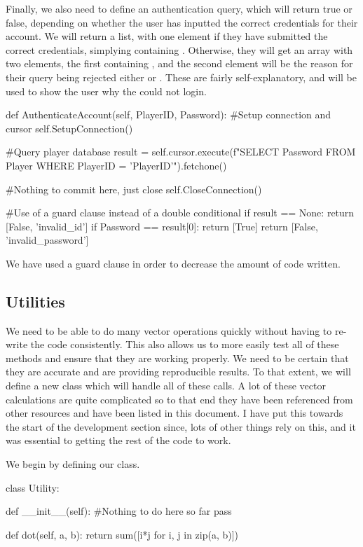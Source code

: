 Finally, we also need to define an authentication query, which will return true or false, depending on whether the user has inputted the correct credentials for their account. We will return a list, with one element if they have submitted the correct credentials, simplying containing \m{[True]}. Otherwise, they will get an array with two elements, the first containing , and the second element will be the reason for their query being rejected either  or . These are fairly self-explanatory, and will be used to show the user why the could not login.
\vs
\begin{mpy}
    def AuthenticateAccount(self, PlayerID, Password):
        #Setup connection and cursor
        self.SetupConnection()

        #Query player database
        result = self.cursor.execute(f"SELECT Password FROM Player WHERE PlayerID = '{PlayerID}'").fetchone()

        #Nothing to commit here, just close
        self.CloseConnection()

        #Use of a guard clause instead of a double conditional
        if result == None:
            return [False, 'invalid_id']
        if Password == result[0]:
            return [True]
        return [False, 'invalid_password']
\end{mpy}
\vs
We have used a guard clause in order to decrease the amount of code written.

\subsection{Utilities}

We need to be able to do many vector operations quickly without having to re-write the code consistently. This also allows us to more easily test all of these methods and ensure that they are working properly. We need to be certain that they are accurate and are providing reproducible results. To that extent, we will define a new class  which will handle all of these calls. A lot of these vector calculations are quite complicated so to that end they have been referenced from other resources and have been listed in this document. I have put this towards the start of the development section since, lots of other things rely on this, and it was essential to getting the rest of the code to work.

\vs
We begin by defining our class.
\begin{mpy}
class Utility:

    def __init__(self):
        #Nothing to do here so far
        pass

    def dot(self, a, b):
        return sum([i*j for i, j in zip(a, b)])
\end{mpy}


